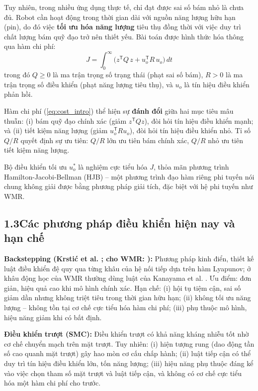 \documentclass[12pt,a4paper]{article}
\newcommand{\T}{\mathsf{T}}
\begin{document}
Tuy nhiên, trong nhiều ứng dụng thực tế, chỉ đạt được sai số bám nhỏ là chưa đủ. Robot cần hoạt động trong thời gian dài với nguồn năng lượng hữu hạn (pin), do đó việc \textbf{tối ưu hóa năng lượng} tiêu thụ đồng thời với việc duy trì chất lượng bám quỹ đạo trở nên thiết yếu. Bài toán được hình thức hóa thông qua hàm chi phí:
\begin{equation}\label{eq:cost_intro}
    J = \int_0^\infty \big( z^\T Q\, z + u_o^\T R\, u_o \big)\, dt
\end{equation}
trong đó $Q \geq 0$ là ma trận trọng số trạng thái (phạt sai số bám), $R > 0$ là ma trận trọng số điều khiển (phạt năng lượng tiêu thụ), và $u_o$ là tín hiệu điều khiển phản hồi.

Hàm chi phí (\ref{eq:cost_intro}) thể hiện sự \textbf{đánh đổi} giữa hai mục tiêu mâu thuẫn: (i) bám quỹ đạo chính xác (giảm $z^\T Q z$), đòi hỏi tín hiệu điều khiển mạnh; và (ii) tiết kiệm năng lượng (giảm $u_o^\T R u_o$), đòi hỏi tín hiệu điều khiển nhỏ. Tỉ số $Q/R$ quyết định sự ưu tiên: $Q/R$ lớn ưu tiên bám chính xác, $Q/R$ nhỏ ưu tiên tiết kiệm năng lượng.

Bộ điều khiển tối ưu $u_o^*$ là nghiệm cực tiểu hóa $J$, thỏa mãn phương trình Hamilton-Jacobi-Bellman (HJB) -- một phương trình đạo hàm riêng phi tuyến nói chung không giải được bằng phương pháp giải tích, đặc biệt với hệ phi tuyến như WMR.

\subsection*{1.3\quad Các phương pháp điều khiển hiện nay và hạn chế}

\textbf{Backstepping (Krstić et al. \cite{Krstic1995}; cho WMR: \cite{Fierro1997, Jiang1997}):} Phương pháp kinh điển, thiết kế luật điều khiển đệ quy qua từng khâu của hệ nối tiếp dựa trên hàm Lyapunov; ở khâu động học của WMR thường dùng luật của Kanayama et al. \cite{Kanayama1990}. Ưu điểm: đơn giản, hiệu quả cao khi mô hình chính xác. Hạn chế: (i) hội tụ tiệm cận, sai số giảm dần nhưng không triệt tiêu trong thời gian hữu hạn; (ii) không tối ưu năng lượng -- không tồn tại cơ chế cực tiểu hóa hàm chi phí; (iii) phụ thuộc mô hình, hiệu năng giảm khi có bất định.

\textbf{Điều khiển trượt (SMC):} Điều khiển trượt có khả năng kháng nhiễu tốt nhờ cơ chế chuyển mạch trên mặt trượt. Tuy nhiên: (i) hiện tượng rung (dao động tần số cao quanh mặt trượt) gây hao mòn cơ cấu chấp hành; (ii) luật tiếp cận có thể duy trì tín hiệu điều khiển lớn, tốn năng lượng; (iii) hiệu năng phụ thuộc đáng kể vào việc chọn tham số mặt trượt và luật tiếp cận, và không có cơ chế cực tiểu hóa một hàm chi phí cho trước.
\end{document}
